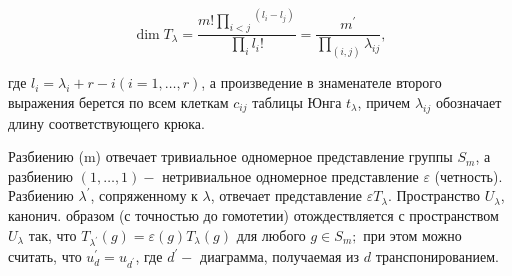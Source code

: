 \documentclass[10pt]{article}
\begin{document}
\[

\operatorname{dim} T_{\lambda}=\frac{m ! \prod_{i<j}{ }^{\left(l_{i}-l_{j}\right)}}{\prod_{i} l_{i} !}=\frac{m^{\prime}}{\prod_{(i, j)} \lambda_{i j}},

\]



где $l_{i}=\lambda_{i}+r-i(i=1, \ldots, r)$, а произведение в знаменателе второго выражения берется по всем клеткам $c_{i j}$ таблицы Юнга $t_{\lambda}$, причем $\lambda_{i j}$ обозначает длину соответствующего крюка.



Разбиению (m) отвечает тривиальное одномерное представление группы $S_{m}$, а разбиению $(1, \ldots, 1)-$ нетривиальное одномерное представление $\varepsilon$ (четность). Разбиению $\lambda^{\prime}$, сопряженному к $\lambda$, отвечает представление $\varepsilon T_{\lambda}$. Пространство $U_{\lambda}$, канонич. образом (с точностью до гомотетии) отождествляется с пространством $U_{\lambda}$ так, что $T_{\lambda^{\prime}}(g)=\varepsilon(g) T_{\lambda}(g)$ для любого $g \in S_{m} ;$ при этом можно считать, что $u_{d}^{\prime}=u_{d^{\prime}}$, где $d^{\prime}-$ диаграмма, получаемая из $d$ транспонированием.
\end{document}
